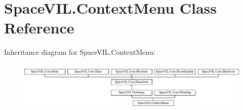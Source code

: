 \hypertarget{class_space_v_i_l_1_1_context_menu}{}\section{Space\+V\+I\+L.\+Context\+Menu Class Reference}
\label{class_space_v_i_l_1_1_context_menu}
Inheritance diagram for Space\+V\+I\+L.\+Context\+Menu\+:\begin{figure}[H]
\begin{center}
\leavevmode
\includegraphics[height=2.421622cm]{class_space_v_i_l_1_1_context_menu}
\end{center}
\end{figure}
